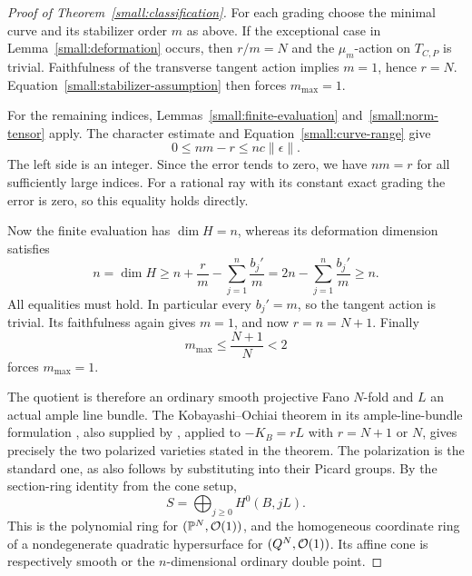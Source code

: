 \begin{proof}[Proof of Theorem~\ref{small:classification}]
For each grading choose the minimal curve and its stabilizer order
\(m\) as above.  If the exceptional case in
Lemma~\ref{small:deformation} occurs, then \(r/m=N\) and the
\(\mu_m\)-action on \(T_{C,P}\) is trivial.  Faithfulness of the
transverse tangent action implies \(m=1\), hence \(r=N\).
Equation~\eqref{small:stabilizer-assumption} then forces
\(m_{\max}=1\).

For the remaining indices, Lemmas~\ref{small:finite-evaluation}
and~\ref{small:norm-tensor} apply.  The character estimate and
Equation~\eqref{small:curve-range} give
\[
 0\leq nm-r\leq nc\|\epsilon\|.
\]
The left side is an integer.  Since the error tends to zero, we
have \(nm=r\) for all sufficiently large indices.  For a rational
ray with its constant exact grading the error is zero, so this
equality holds directly.

Now the finite evaluation has \(\dim H=n\), whereas its deformation
dimension satisfies
\[
 n=\dim H\geq n+\frac rm-\sum_{j=1}^n\frac{b_j'}m
 =2n-\sum_{j=1}^n\frac{b_j'}m\geq n.
\]
All equalities must hold.  In particular every \(b_j'=m\), so the
tangent action is trivial.  Its faithfulness again gives \(m=1\),
and now \(r=n=N+1\).  Finally
\[
 m_{\max}\leq\frac{N+1}{N}<2
\]
forces \(m_{\max}=1\).

The quotient is therefore an ordinary smooth projective Fano
\(N\)-fold and \(L\) an actual ample line bundle.  The
Kobayashi--Ochiai theorem in its ample-line-bundle formulation
\cite{KO73}, also supplied by \cite[Theorems~1.1 and~1.3]{ADK08}, applied to
\(-K_B=rL\) with \(r=N+1\) or \(N\), gives precisely the two
polarized varieties stated in the theorem.  The polarization is
the standard one, as also follows by substituting into their
Picard groups.  By the section-ring identity from the cone setup,
\[
 S=\bigoplus_{j\geq0}H^0(B,jL).
\]
This is the polynomial ring for \((\mathbb P^N,\mathcal O(1))\), and the
homogeneous coordinate ring of a nondegenerate quadratic
hypersurface for \((Q^N,\mathcal O(1))\).  Its affine cone is respectively
smooth or the \(n\)-dimensional ordinary double point.
\end{proof}
